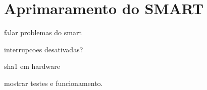 \chapter{Aprimaramento do SMART}
\label{cap:desenvolvimentos}

falar problemas do smart

interrupcoes desativadas?

sha1 em hardware


mostrar testes e funcionamento.


